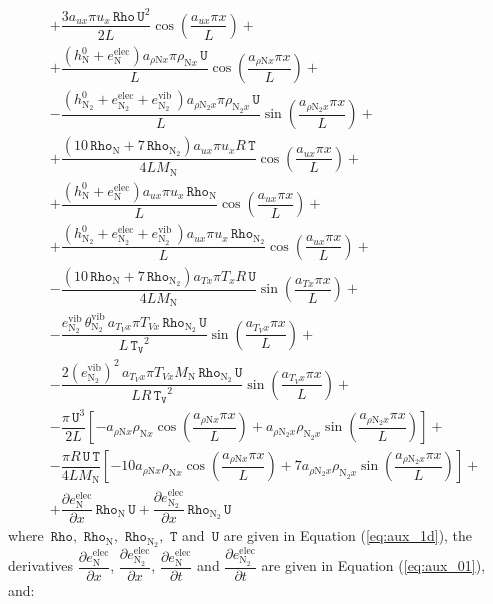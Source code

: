 \documentclass[10pt]{article}
\newcommand{\diff}[2] {\dfrac{\partial #1 }{\partial #2}}
\newcommand{\Rho}{\,\mathtt{Rho}}
\newcommand{\T}{\,\mathtt{T}}
\newcommand{\U}{\,\mathtt{U}}
\newcommand{\TV}{\,\mathtt{T_V}}
\newcommand{\N}{\text{N}}
\newcommand{\elec}{\text{elec}}
\newcommand{\vib}{\text{vib}}
\begin{document}
\begin{equation}
\begin{split}
&+ \dfrac{3 a_{ux} \pi u_x \Rho \U^2 }{2L} \cos\left(\dfrac{a_{ux} \pi x}{L}\right) +\\ 
&+\dfrac{(h_{\N}^0+e_{\N}^{\elec}) a_{  \rho \N x } \pi \rho_{\N x} \U }{L} \cos\left(\dfrac{a_{  \rho \N x } \pi x}{L}\right) +\\ &-\dfrac{(h_{\N_2}^0+e_{\N_2}^{\elec}+e_{\N_2}^{\vib} \, ) a_{  \rho \N_2 x } \pi \rho_{\N_2 x} \U }{L} \sin\left(\dfrac{a_{  \rho \N_2 x } \pi x}{L}\right)  +\\ &+\dfrac{ (10 \Rho_{\N}+7 \Rho_{\N_2}) a_{ux} \pi u_x R \T  }{4L M_\N} \cos\left(\dfrac{a_{ux} \pi x}{L}\right)+\\ 
&+\dfrac{(h_{\N}^0+e_{\N}^{\elec}) a_{ux} \pi u_x \Rho_{\N}}{L} \cos\left(\dfrac{a_{ux} \pi x}{L}\right)  +\\ 
&+\dfrac{(h_{\N_2}^0+e_{\N_2}^{\elec}+e_{\N_2}^{\vib} \, ) a_{ux} \pi u_x \Rho_{\N_2} }{L}\cos\left(\dfrac{a_{ux} \pi x}{L}\right) +\\ 
&-\dfrac{ (10 \Rho_{\N}+7 \Rho_{\N_2}) a_{Tx} \pi T_x R \U }{4L M_\N}\sin\left(\dfrac{a_{Tx} \pi x}{L}\right)  +\\ 
&-\dfrac{e_{\N_2}^{\vib} \, \theta^{\vib}_{\N_2} \,   a_{T_V x} \pi T_{Vx} \Rho_{\N_2} \U }{L \TV^2}\sin\left(\dfrac{a_{T_V x} \pi x}{L}\right) +\\
&-\dfrac{2 (e_{\N_2}^{\vib})^2 \, a_{T_V x} \pi T_{Vx} M_\N \Rho_{\N_2} \U }{L R \TV^2}\sin\left(\dfrac{a_{T_V x} \pi x}{L}\right) +\\
&-\dfrac{ \pi \U^3 }{2L}\left[-a_{  \rho \N x } \rho_{\N x} \cos\left(\dfrac{a_{  \rho \N x } \pi x}{L}\right) +a_{  \rho \N_2 x } \rho_{\N_2 x} \sin\left(\dfrac{a_{  \rho \N_2 x } \pi x}{L}\right) \right]  +\\ 
&-\dfrac{\pi R \U \T}{4L M_\N} \left[-10 a_{  \rho \N x } \rho_{\N x} \cos\left(\dfrac{a_{  \rho \N x } \pi x}{L}\right) +7 a_{  \rho \N_2 x } \rho_{\N_2 x} \sin\left(\dfrac{a_{  \rho \N_2 x } \pi x}{L}\right) \right]  +\\ 
&+\diff{e_{\N}^{\elec}}{x} \Rho_{\N} \U+\diff{e_{\N_2}^{\elec}}{x} \Rho_{\N_2} \U
\end{split}
\end{equation}
where $\Rho,\,\Rho_{\text{N}},\,\Rho_{\text{N}_2},\, \T$ and $\U$ are given  in Equation (\ref{eq:aux_1d}), the derivatives $\diff{e_{\N}^{\elec}}{x}$, $\diff{e_{\N_2}^{\elec}}{x}$, $\diff{e_{\N}^{\elec}}{t}$ and $\diff{e_{\N_2}^{\elec}}{t}$ are given in Equation (\ref{eq:aux_01}), and:
\end{document}
